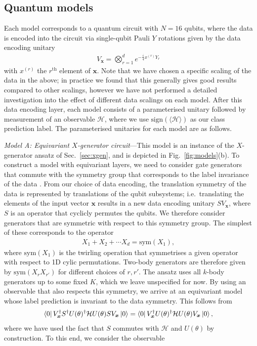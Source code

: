 \documentclass[twocolumn]{revtex4-2}
\renewcommand{\vec}{\boldsymbol}
\begin{document}
\subsection{Quantum models}
Each model corresponds to a quantum circuit with $N=16$ qubits, where the data is encoded into the circuit via single-qubit Pauli $Y$ rotations given by the data encoding unitary
%
\begin{align}
    V_{\vec{x}} = \bigotimes_{r=1}^d 
    e^{-\frac{i}{4}x^{(r)} Y_r}
\end{align}
%
with $x^{(r)}$ the $r^{\text{th}}$ element of $\vec{x}$. Note that we have chosen a specific scaling of the data in the above; in practice we found that this generally gives good results compared to other scalings, however we have not performed a detailed investigation into the effect of different data scalings on each model. After this data encoding layer, each model consists of a parameterised unitary followed by measurement of an observable $\mathcal{H}$, where we use $\text{sign}(\langle\mathcal{H}\rangle)$ as our class prediction label. The parameterised unitaries for each model are as follows. 

\emph{Model A: Equivariant $X$-generator circuit}---This model is an instance of the $X$-generator ansatz of Sec.\ \ref{sec:xgen}, and is depicted in Fig.\ \ref{fig:models}(b). To construct a model with equivariant layers, we need to consider gate generators that commute with the symmetry group that corresponds to the label invariance of the data \cite{nguyen2022, ragone2022representation}. 
From our choice of data encoding, the translation symmetry of the data is represented by translations of the qubit subsystems; i.e.\ translating the elements of the input vector $\vec{x}$ results in a new data encoding unitary $SV_{\vec{x}}$, where $S$ is an operator that cyclicly permutes the qubits. We therefore consider generators that are symmetric with respect to this symmetry group. The simplest of these corresponds to the operator
%
\begin{align}
    X_1 + X_2 + \cdots X_d = \text{sym}(X_1),
\end{align}
%
where $\text{sym}(X_1)$ is the twirling operation \cite{meyer2023exploiting,nguyen2022} that symmetrises a given operator with respect to 1D cylic permutations. Two-body generators are therefore given by $\text{sym}(X_rX_{r'})$ for different choices of $r,r'$. The ansatz uses all $k$-body generators up to some fixed $K$, which we leave unspecified for now. By using an observable that also respects this symmetry, we arrive at an equivariant model whose label prediction is invariant to the data symmetry. This follows from
%
\begin{align}\nonumber
    \bra{0}V_{\vec{x}}^\dagger S^\dagger U(\theta)^\dagger \mathcal{H} U(\theta) S V_{\vec{x}}\ket{0} = \bra{0}V_{\vec{x}}^\dagger U(\theta)^\dagger \mathcal{H} U(\theta) V_{\vec{x}}\ket{0},
\end{align}
%
where we have used the fact that $S$ commutes with $\mathcal{H}$ and $U(\theta)$ by construction. To this end, we consider the observable 
\end{document}
